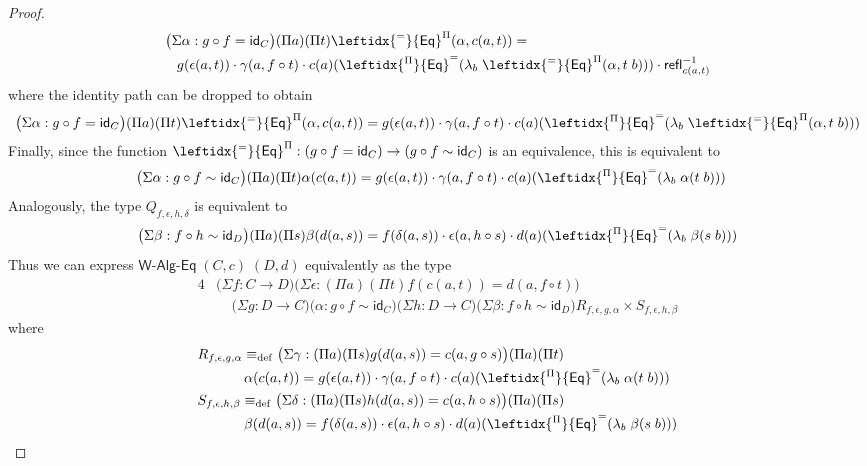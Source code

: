 \documentclass[reqno,10pt,a4paper,oneside]{amsart}
\numberwithin{equation}{section}
\theoremstyle{mythm}
\theoremstyle{mydef}
\theoremstyle{myrmk}
\newcommand{\deq}{\equiv}
\newcommand{\defeq}{\deq_{\mathrm{def}}}
\newcommand{\idfun}[1]{\mathsf{id}_{#1}}
\newcommand{\comp}{\circ}
\newcommand{\ct}{\cdot}
\newcommand{\funext}{\leftidx{^\Pi}{\mathsf{Eq}}^{=}}
\newcommand{\happly}{\leftidx{^=}{\mathsf{Eq}}^{\Pi}}
\newcommand{\lam}[1]{\lambda_{#1}}
\newcommand{\refl}{\mathsf{refl}}
\newcommand{\WAlgIso}{\mathsf{W}\text{-}\mathsf{Alg}\text{-}\mathsf{Eq}}
\begin{document}
\begin{proof}
\begin{align*}
& \big(\Sigma \alpha : g \comp f = \idfun{C} \big) (\Pi a) (\Pi t) \happly(\alpha,c(a,t)) =  \\ & \;\;\; g(\epsilon(a,t)) \ct \gamma(a, f \comp t) \ct c(a)(\funext(\lam{b} \; \happly(\alpha,t\;b))) \ct \refl_{c(a,t)}^{-1}
\end{align*}
where the identity path can be dropped to obtain
\begin{align*}
\big(\Sigma \alpha : g \comp f = \idfun{C} \big) (\Pi a) (\Pi t) \happly(\alpha,c(a,t)) = g(\epsilon(a,t)) \ct \gamma(a, f \comp t) \ct c(a)(\funext(\lam{b} \; \happly(\alpha,t\;b)))
\end{align*}
Finally, since the function $\happly : (g \comp f = \idfun{C}) \to (g \comp f \sim \idfun{C})$ is an equivalence, this is equivalent to
\begin{align*}
& \big(\Sigma \alpha : g \comp f \sim \idfun{C} \big) (\Pi a) (\Pi t) \alpha(c(a,t)) = g(\epsilon(a,t)) \ct \gamma(a, f \comp t) \ct c(a)(\funext(\lam{b} \; \alpha(t\;b)))
\end{align*}
Analogously, the type $Q_{f,\epsilon,h,\delta}$ is equivalent to
\begin{alignat*}{4}
\big(\Sigma \beta : f \comp h \sim \idfun{D} \big) (\Pi a) (\Pi s) \beta(d(a,s)) = f(\delta(a,s)) \ct \epsilon(a, h \comp s) \ct d(a)(\funext(\lam{b} \; \beta(s\;b)))
\end{alignat*}
Thus we can express $\WAlgIso \; (C,c) \; (D,d)$ equivalently as the type
\begin{alignat*}{4}
& \big(\Sigma f : C\to D) \big(\Sigma \epsilon : (\Pi a) (\Pi t) f(c(a,t)) = d(a,f \comp t)\big) \\ & \;\;\;\; \big(\Sigma g:D\to C\big) \big(\alpha : g \comp f \sim \idfun{C}\big) \big(\Sigma h:D \to C\big) \big(\Sigma \beta : f \comp h \sim \idfun{D}\big) R_{f,\epsilon,g,\alpha} \times S_{f,\epsilon,h,\beta}
\end{alignat*}
where
\begin{alignat*}{4}
& R_{f,\epsilon,g,\alpha} \defeq \big(\Sigma \gamma : (\Pi a) (\Pi s) g(d(a,s)) = c(a,g \comp s)\big) (\Pi a) (\Pi t) \\ & \;\;\;\;\;\;\;\;\;\;\;\; \alpha(c(a,t)) = g(\epsilon(a,t)) \ct \gamma(a, f \comp t) \ct c(a)(\funext(\lam{b} \; \alpha(t\;b))) \\
& S_{f,\epsilon,h,\beta} \defeq \big(\Sigma \delta : (\Pi a) (\Pi s) h(d(a,s)) = c(a,h \comp s)\big) (\Pi a) (\Pi s) \\ & \;\;\;\;\;\;\;\;\;\;\;\; \beta(d(a,s)) = f(\delta(a,s)) \ct \epsilon(a, h \comp s) \ct d(a)(\funext(\lam{b} \; \beta(s\;b)))

\end{alignat*}
\end{proof}
\end{document}
